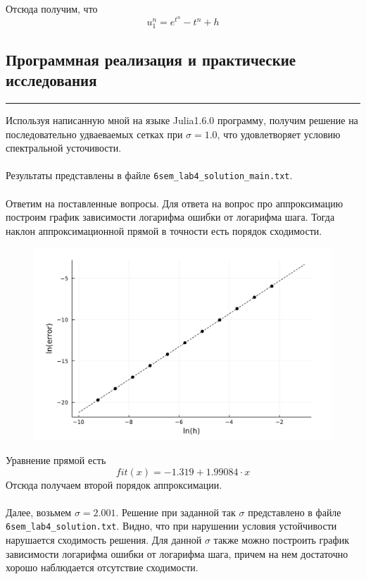 \documentclass[12pt,a4paper, titlepage]{article}
\begin{document}
Отсюда получим, что 
\begin{equation}
u^n_1 = e^{t^n} - t^n + h
\end{equation}

\subsection*{Программная реализация и практические исследования}
\noindent\rule{\textwidth}{1pt}
Используя написанную мной на языке Julia1.6.0 программу, получим решение на последовательно удваеваемых сетках при $\sigma = 1.0$, что удовлетворяет условию спектральной усточивости.
\\
\\
Результаты представлены в файле \verb|6sem_lab4_solution_main.txt|.
\\
\\
Ответим на поставленные вопросы. Для ответа на вопрос про аппроксимацию построим график зависимости логарифма ошибки от логарифма шага. Тогда наклон аппроксимационной прямой в точности есть порядок сходимости.
\begin{figure}[H]
	\centering
	\includegraphics[width = 1.0\textwidth]{lab4_2.png}
\end{figure}
Уравнение прямой есть
\begin{equation}
fit(x) = -1.319 + 1.99084 \cdot x
\end{equation}
Отсюда получаем второй порядок аппроксимации.
\\
\\
Далее, возьмем $\sigma = 2.001$. Решение при заданной так $\sigma$ представлено в файле \verb|6sem_lab4_solution.txt|. Видно, что при нарушении условия устойчивости нарушается сходимость решения. Для данной $\sigma$ также можно построить график зависимости логарифма ошибки от логарифма шага, причем на нем достаточно хорошо наблюдается отсутствие сходимости.
\end{document}
